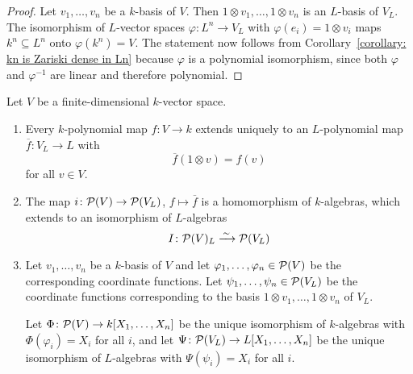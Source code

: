 \begin{proof}
  Let $v_1, \dotsc, v_n$ be a $k$-basis of $V$.
  Then $1 \otimes v_1, \dotsc, 1 \otimes v_n$ is an $L$-basis of $V_L$.
  The isomorphism of $L$-vector spaces $\varphi \colon L^n \to V_L$ with $\varphi(e_i) = 1 \otimes v_i$ maps $k^n \subseteq L^n$ onto $\varphi(k^n) = V$.
  The statement now follows from Corollary~\ref{corollary: kn is Zariski dense in Ln} because $\varphi$ is a polynomial isomorphism, since both $\varphi$ and $\varphi^{-1}$ are linear and therefore polynomial.
\end{proof}


\begin{proposition}
  \label{proposition: consistent choice of identification for polynomial functions}
  Let $V$ be a finite-dimensional $k$-vector space.
  \begin{enumerate}
    \item
      Every $k$-polynomial map $f \colon V \to k$ extends uniquely to an $L$-polynomial map $\overline{f} \colon V_L \to L$ with
      \[
          \overline{f}(1 \otimes v)
        = f(v)
      \]
      for all $v \in V$.
    \item
      The map $i \colon \mathcal{P}(V) \to \mathcal{P}(V_L)$, $f \mapsto \overline{f}$ is a homomorphism of $k$-algebras, which extends to an isomorphism of $L$-algebras
      \[
                                I
        \colon                  \mathcal{P}(V)_L
        \xrightarrow{\,\sim\,}  \mathcal{P}(V_L)
      \]
    \item
      Let $v_1, \dotsc, v_n$ be a $k$-basis of $V$ and let $\varphi_1, \dotsc, \varphi_n \in \mathcal{P}(V)$ be the corresponding coordinate functions.
      Let $\psi_1, \dotsc, \psi_n \in \mathcal{P}(V_L)$ be the coordinate functions corresponding to the basis $1 \otimes v_1, \dotsc, 1 \otimes v_n$ of $V_L$.
      
      Let $\Phi \colon \mathcal{P}(V) \to k[X_1, \dotsc, X_n]$ be the unique isomorphism of $k$-algebras with $\Phi(\varphi_i) = X_i$ for all $i$, and let $\Psi \colon \mathcal{P}(V_L) \to L[X_1, \dotsc, X_n]$ be the unique isomorphism of $L$-algebras with $\Psi(\psi_i) = X_i$ for all $i$.
      

\end{enumerate}
\end{proposition}

